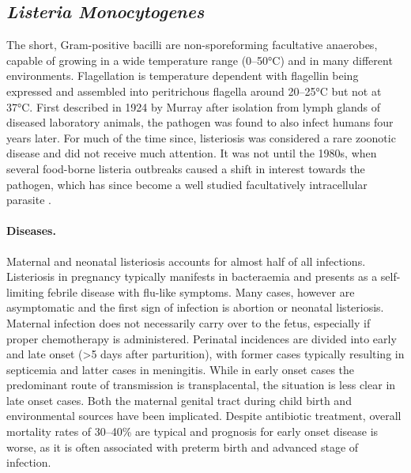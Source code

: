 \subsection{\textit{Listeria Monocytogenes}}

The short, Gram-positive bacilli are non-sporeforming facultative anaerobes, capable of growing in a wide temperature range (0--50\si{\degree}C) and in many different environments. Flagellation is temperature dependent with flagellin being expressed and assembled into peritrichous flagella around 20--25\si{\degree}C but not at 37\si{\degree}C. First described in 1924 by Murray after isolation from lymph glands of diseased laboratory animals, the pathogen was found to also infect humans four years later. For much of the time since, listeriosis was considered a rare zoonotic disease and did not receive much attention. It was not until the 1980s, when several food-borne listeria outbreaks caused a shift in interest towards the pathogen, which has since become a well studied facultatively intracellular parasite \citep{Farber1991,Cossart2014}.

\paragraph{Diseases.}
Maternal and neonatal listeriosis accounts for almost half of all infections. Listeriosis in pregnancy typically manifests in bacteraemia and presents as a self-limiting febrile disease with flu-like symptoms. Many cases, however are asymptomatic and the first sign of infection is abortion or neonatal listeriosis. Maternal infection does not necessarily carry over to the fetus, especially if proper chemotherapy is administered. Perinatal incidences are divided into early and late onset (\textgreater 5 days after parturition), with former cases typically resulting in septicemia and latter cases in meningitis. While in early onset cases the predominant route of transmission is transplacental, the situation is less clear in late onset cases. Both the maternal genital tract during child birth and environmental sources have been implicated. Despite antibiotic treatment, overall mortality rates of 30--40\% are typical and prognosis for early onset disease is worse, as it is often associated with preterm birth and advanced stage of infection. 

